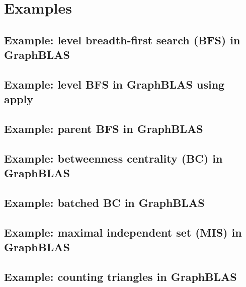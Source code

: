 \chapter{Examples}
\label{Chp:Examples}

\pagebreak
\nolinenumbers
\section{Example: level breadth-first search (BFS) in GraphBLAS}
{\scriptsize

}
\vfill

\pagebreak
\nolinenumbers
\section{Example: level BFS in GraphBLAS using apply}
{\scriptsize

}
\vfill

\pagebreak
\nolinenumbers
\section{Example: parent BFS in GraphBLAS}
{\scriptsize

}
\vfill

\pagebreak
\nolinenumbers
\section{Example: betweenness centrality (BC) in GraphBLAS}
\label{App:BCnobatch}
{\scriptsize

}
\vfill

\pagebreak
\nolinenumbers
\section{Example: batched BC in GraphBLAS}
{\scriptsize

}
\vfill

\pagebreak
\nolinenumbers
\section{Example: maximal independent set (MIS) in GraphBLAS}
{\scriptsize

}
\vfill

\pagebreak
\nolinenumbers
\section{Example: counting triangles in GraphBLAS}
{\scriptsize

}
\vfill
\pagebreak

\linenumbers
